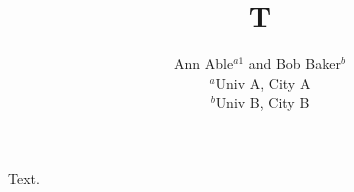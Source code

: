 \documentclass{article}
\begin{document}
\def\a{{a}}
\def\b{{b}}
\title{T}
\author{Ann Able$^{\a 1}$ and Bob Baker$^\b$\\
{}$^a$Univ A, City A\\
{}$^b$Univ B, City B}
\maketitle
Text.
\end{document}
